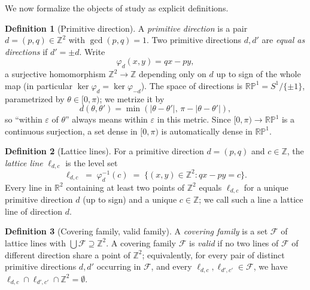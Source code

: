 \documentclass[a4paper,11pt,oneside,reqno]{amsart}
\theoremstyle{definition}
\newtheorem{definition}{Definition}
\theoremstyle{remark}
\theoremstyle{plain}
\newcommand{\Z}{\mathbb{Z}}
\newcommand{\R}{\mathbb{R}}
\newcommand{\RP}{\mathbb{RP}^1}
\begin{document}
We now formalize the objects of study as explicit definitions.

\begin{definition}[Primitive direction]
  \label{def:direction}
  A \emph{primitive direction} is a pair \(d=(p,q)\in\Z^2\) with \(\gcd(p,q)=1\). Two primitive
  directions \(d,d'\) are \emph{equal as directions} if \(d'=\pm d\). Write
  \begin{equation}
    \label{eq:phi-def}
    \varphi_d(x,y) = qx-py,
  \end{equation}
  a surjective homomorphism \(\Z^2\to\Z\) depending only on \(d\) up to sign of the whole map (in
  particular \(\ker\varphi_d=\ker\varphi_{-d}\)). The space of directions is \(\RP=S^1/\{\pm1\}\),
  parametrized by \(\theta\in[0,\pi)\); we metrize it by
  \begin{equation}
    \label{eq:RP-metric}
    d(\theta,\theta') = \min(|\theta-\theta'|,\,\pi-|\theta-\theta'|),
  \end{equation}
  so ``within \(\varepsilon\) of \(\theta\)'' always means within \(\varepsilon\) in this metric. Since
  \([0,\pi)\to\RP\) is a continuous surjection, a set dense in \([0,\pi)\) is automatically dense in
  \(\RP\).
\end{definition}

\begin{definition}[Lattice lines]
  \label{def:lline}
  For a primitive direction \(d=(p,q)\) and \(c\in\Z\), the \emph{lattice line} \(\ell_{d,c}\) is the
  level set
  \begin{equation}
    \label{eq:lline-def}
    \ell_{d,c} \;=\; \varphi_d^{-1}(c) \;=\; \{(x,y)\in\Z^2 : qx-py=c\}.
  \end{equation}
  Every line in \(\R^2\) containing at least two points of \(\Z^2\) equals \(\ell_{d,c}\) for a unique
  primitive direction \(d\) (up to sign) and a unique \(c\in\Z\); we call such a line a lattice line of
  direction \(d\).
\end{definition}

\begin{definition}[Covering family, valid family]
  \label{def:family}
  A \emph{covering family} is a set \(\mathcal F\) of lattice lines with \(\bigcup\mathcal F\supseteq\Z^2\). A
  covering family \(\mathcal F\) is \emph{valid} if no two lines of \(\mathcal F\) of different
  direction share a point of \(\Z^2\); equivalently, for every pair of distinct primitive directions
  \(d,d'\) occurring in \(\mathcal F\), and every \(\ell_{d,c},\ell_{d',c'}\in\mathcal F\), we have
  \(\ell_{d,c}\cap\ell_{d',c'}\cap\Z^2=\emptyset\).
\end{definition}
\end{document}
